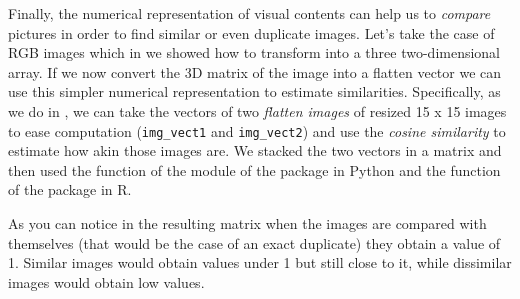 
Finally, the numerical representation of visual contents can help us to \textit{compare} pictures in order to find similar or even duplicate images. Let's take the case of RGB images which in  we showed how to transform into a three two-dimensional array. If we now convert the 3D matrix of the image into a flatten vector we can use this simpler numerical representation to estimate similarities. Specifically, as we do in , we can take the vectors of two \textit{flatten images} of resized 15 x 15 images to ease computation (\texttt{img\_vect1} and \texttt{img\_vect2}) and use the \textit{cosine similarity} to estimate how akin those images are. We stacked the two vectors in a matrix and then used the  function of the  module of the   package in Python and the  function of the  package in R.

 
As you can notice in the resulting matrix when the images are compared with themselves (that would be the case of an exact duplicate) they obtain a value of 1. Similar images would obtain values under 1 but still close to it, while dissimilar images would obtain low values.
